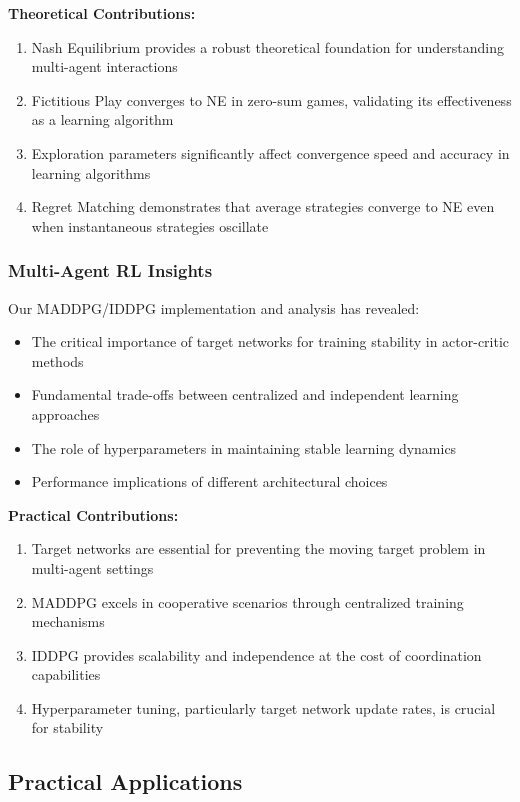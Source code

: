 \documentclass[conference]{IEEEtran}
\begin{document}
{{\textbf{Theoretical Contributions:}
\begin{enumerate}
    \item Nash Equilibrium provides a robust theoretical foundation for understanding multi-agent interactions
    \item Fictitious Play converges to NE in zero-sum games, validating its effectiveness as a learning algorithm
    \item Exploration parameters significantly affect convergence speed and accuracy in learning algorithms
    \item Regret Matching demonstrates that average strategies converge to NE even when instantaneous strategies oscillate
\end{enumerate}

\subsubsection{Multi-Agent RL Insights}

Our MADDPG/IDDPG implementation and analysis has revealed:

\begin{itemize}
    \item The critical importance of target networks for training stability in actor-critic methods
    \item Fundamental trade-offs between centralized and independent learning approaches
    \item The role of hyperparameters in maintaining stable learning dynamics
    \item Performance implications of different architectural choices
\end{itemize}

\textbf{Practical Contributions:}
\begin{enumerate}
    \item Target networks are essential for preventing the moving target problem in multi-agent settings
    \item MADDPG excels in cooperative scenarios through centralized training mechanisms
    \item IDDPG provides scalability and independence at the cost of coordination capabilities
    \item Hyperparameter tuning, particularly target network update rates, is crucial for stability
\end{enumerate}

\subsection{Practical Applications}

}}
\end{document}
